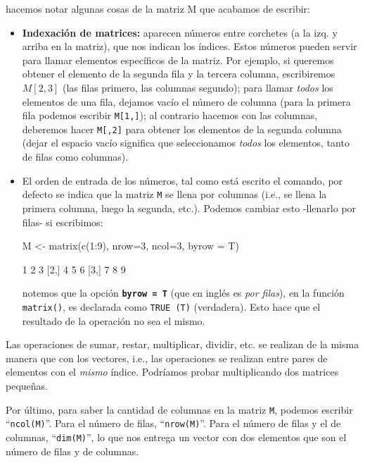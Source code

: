 \documentclass[11pt,a4paper]{article}
\begin{document}
\noindent hacemos notar algunas cosas de la matriz M que acabamos de escribir:


\begin{itemize}

\item[$\bullet$] \textbf{Indexación de matrices:} aparecen números entre corchetes (a la izq. y arriba en la matriz), que nos indican los índices. Estos números pueden servir para llamar elementos específicos de la matriz. Por ejemplo, si queremos obtener el elemento de la segunda fila y la tercera columna, escribiremos $M[2,3]$ (las filas primero, las columnas segundo); para llamar \textit{todos} los elementos de una fila, dejamos vacío el número de columna (para la primera fila podemos escribir \texttt{M[1,]}); al contrario hacemos con las columnas, deberemos hacer \texttt{M[,2]} para obtener los elementos de la segunda columna (dejar el espacio vacío significa que seleccionamos \textit{todos} los elementos, tanto de filas como columnas).

\item[$\bullet$] El orden de entrada de los números, tal como está escrito el comando, por defecto se indica que la matriz \texttt{M} se llena por columnas (i.e., se llena la primera columna, luego la segunda, etc.). Podemos cambiar esto -llenarlo por filas- si escribimos:

\begin{Schunk}
\begin{Sinput}
 M <- matrix(c(1:9), nrow=3, ncol=3, byrow = T)
\end{Sinput}
\begin{Soutput}
     [,1] [,2] [,3]
[1,]    1    2    3
[2,]    4    5    6
[3,]    7    8    9
\end{Soutput}
\end{Schunk}

\noindent notemos que la opción \texttt{\textbf{byrow = T}} (que en inglés es \textit{por filas}), en la función \texttt{matrix()}, es declarada como \texttt{TRUE (T)} (verdadera). Esto hace que el resultado de la operación no sea el mismo.
\end{itemize}

Las operaciones de sumar, restar, multiplicar, dividir, etc. se realizan de la misma manera que con los vectores, i.e., las operaciones se realizan entre pares de elementos con el \textit{mismo} índice. Podríamos probar multiplicando dos matrices pequeñas.

Por último, para saber la cantidad de columnas en la matriz \texttt{M}, podemos escribir ``\texttt{ncol(M)}''. Para el número de filas, ``\texttt{nrow(M)}''. Para el número de filas y el de columnas, ``\texttt{dim(M)}'', lo que nos entrega un vector con dos elementos que son el número de filas y de columnas.
\end{document}
